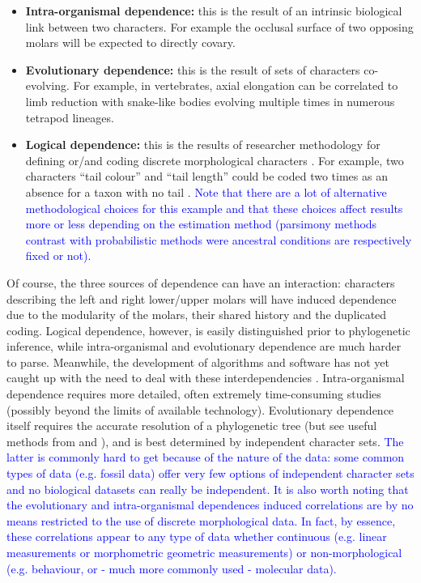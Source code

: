 \documentclass[12pt,letterpaper]{article}
\begin{document}
\begin{itemize}
    \item \textbf{Intra-organismal dependence:} this is the result of an intrinsic biological link between two characters.
    For example the occlusal surface of two opposing molars will be expected to directly covary.
 
    \item \textbf{Evolutionary dependence:} this is the result of sets of characters co-evolving. 
    For example, in vertebrates, axial elongation can be correlated to limb reduction with snake-like bodies evolving multiple times in numerous tetrapod lineages.

    \item \textbf{Logical dependence:} this is the results of researcher methodology for defining or/and coding discrete morphological characters \citep{Brazeau2011,simoes2017giant}.
    For example, two characters ``tail colour'' and ``tail length'' could be coded two times as an absence for a taxon with no tail \citep{wilkinson1995coping,BrazeauNA}.
    \textcolor{blue}{Note that there are a lot of alternative methodological choices for this example \citep[e.g. using inapplicable tokens; ][]{Brazeau2011} and that these choices affect results more or less depending on the estimation method (parsimony methods contrast with probabilistic methods were ancestral conditions are respectively fixed or not).}
\end{itemize}

\noindent Of course, the three sources of dependence can have an interaction: characters describing the left and right lower/upper molars will have induced dependence due to the modularity of the molars, their shared history and the duplicated coding.
Logical dependence, however, is easily distinguished prior to phylogenetic inference, while intra-organismal and evolutionary dependence are much harder to parse.
Meanwhile, the development of algorithms and software has not yet caught up with the need to deal with these interdependencies \citep{de2015parsimony,BrazeauNA}.
Intra-organismal dependence requires more detailed, often extremely time-consuming studies (possibly beyond the limits of available technology).
Evolutionary dependence itself requires the accurate resolution of a phylogenetic tree (but see useful methods from \citealt{Pagel1994} and \citealt{billet2019serial}), and is best determined by independent character sets.
\textcolor{blue}{The latter is commonly hard to get because of the nature of the data: some common types of data (e.g. fossil data) offer very few options of independent character sets and no biological datasets can really be independent.
It is also worth noting that the evolutionary and intra-organismal dependences induced correlations are by no means restricted to the use of discrete morphological data. In fact, by essence, these correlations appear to any type of data whether continuous (e.g. linear measurements or morphometric geometric measurements) or non-morphological (e.g. behaviour, or - much more commonly used - molecular data).}
\end{document}
